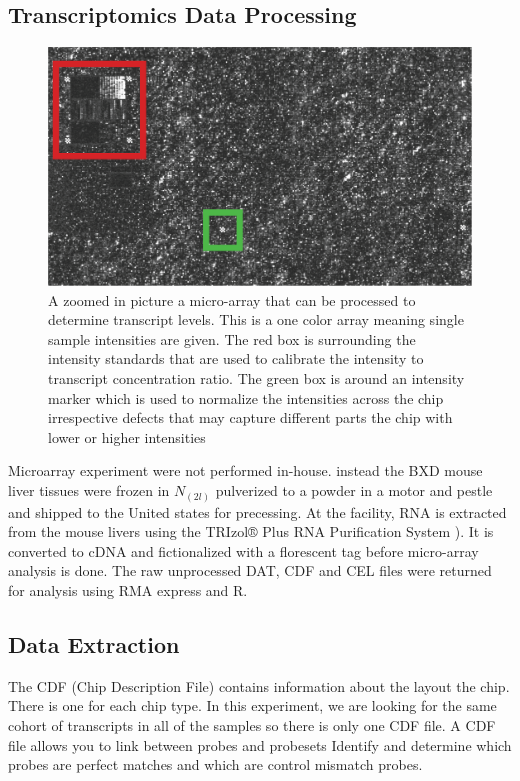 \documentclass[a4paper]{book}
\begin{document}
	\subsection{Transcriptomics Data Processing}
	\begin{figure}
		\includegraphics[width = 1.0\linewidth]{3.Trancriptomics/Affimetrix_Chip_ZoomIn.png}
		\caption{A zoomed in picture a micro-array that can be processed to determine transcript levels. This is a one color array meaning single sample intensities are given. The red box is surrounding the intensity standards that are used to calibrate the intensity to transcript concentration ratio. The green box is around an intensity marker which is used to normalize the intensities across the chip irrespective defects that may capture different parts the chip with lower or higher intensities}
		\label{fig: Zoomed-in Photograph of a Microarray}
	\end{figure}
	
	Microarray experiment were not performed in-house. instead the BXD mouse liver tissues were frozen in $N_(2l)$ pulverized to a powder in a motor and pestle and shipped to the United states for precessing. At the facility, RNA is extracted from the mouse livers using the TRIzol® Plus RNA Purification System \citep{Rio2010TRIzol}). It is converted to cDNA and fictionalized with a florescent tag before micro-array analysis is done. The raw unprocessed DAT, CDF and CEL files were returned for analysis using RMA express and R.
	
	
	\subsection{Data Extraction} 
	
	The CDF (Chip Description File) contains information about the layout the chip. There is one for each chip type. In this experiment, we are looking for the same cohort of transcripts in all of the samples so there is only one CDF file. A CDF file allows you to link between probes and probesets Identify and determine which probes are perfect matches and which are control mismatch probes\citep{Miller2009MicroArrays}.
	
\end{document}
